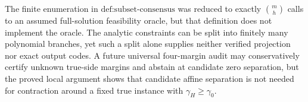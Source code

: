 The finite enumeration in \(\text{def:subset-consensus}\) was reduced to exactly \(\binom{m}{h}\) calls to an assumed full-solution feasibility oracle, but that definition does not implement the oracle. The analytic constraints can be split into finitely many polynomial branches, yet such a split alone supplies neither verified projection nor exact output codes. A future universal four-margin audit may conservatively certify unknown true-side margins and abstain at candidate zero separation, but the proved local argument shows that candidate affine separation is not needed for contraction around a fixed true instance with \(\gamma_H\geq\gamma_0\).